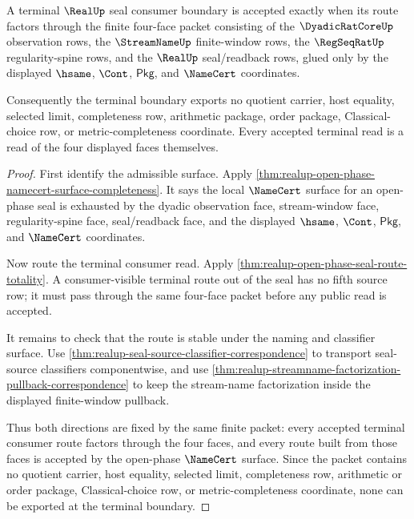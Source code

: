\begin{theorem}
\label{thm:realup-open-phase-terminal-consumer-nonescape}
A terminal $\RealUp$ seal consumer boundary is accepted exactly when its route
factors through the finite four-face packet consisting of the
$\DyadicRatCoreUp$ observation rows, the $\StreamNameUp$ finite-window rows,
the $\RegSeqRatUp$ regularity-spine rows, and the $\RealUp$ seal/readback
rows, glued only by the displayed $\hsame$, $\Cont$, $\mathsf{Pkg}$, and
$\NameCert$ coordinates.

Consequently the terminal boundary exports no quotient carrier, host equality,
selected limit, completeness row, arithmetic package, order package,
Classical-choice row, or metric-completeness coordinate. Every accepted
terminal read is a read of the four displayed faces themselves.
\end{theorem}
\begin{proof}
First identify the admissible surface. Apply
\autoref{thm:realup-open-phase-namecert-surface-completeness}. It says the
local $\NameCert$ surface for an open-phase seal is exhausted by the dyadic
observation face, stream-window face, regularity-spine face, seal/readback
face, and the displayed $\hsame$, $\Cont$, $\mathsf{Pkg}$, and $\NameCert$
coordinates.

Now route the terminal consumer read. Apply
\autoref{thm:realup-open-phase-seal-route-totality}. A consumer-visible
terminal route out of the seal has no fifth source row; it must pass through
the same four-face packet before any public read is accepted.

It remains to check that the route is stable under the naming and classifier
surface. Use \autoref{thm:realup-seal-source-classifier-correspondence} to
transport seal-source classifiers componentwise, and use
\autoref{thm:realup-streamname-factorization-pullback-correspondence} to keep
the stream-name factorization inside the displayed finite-window pullback.

Thus both directions are fixed by the same finite packet: every accepted
terminal consumer route factors through the four faces, and every route built
from those faces is accepted by the open-phase $\NameCert$ surface. Since the
packet contains no quotient carrier, host equality, selected limit,
completeness row, arithmetic or order package, Classical-choice row, or
metric-completeness coordinate, none can be exported at the terminal boundary.
\end{proof}


